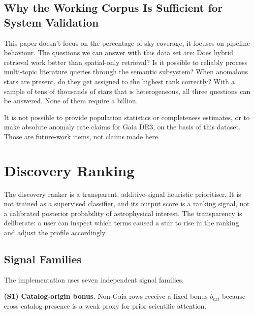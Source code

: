 \documentclass[preprint,12pt,authoryear]{elsarticle}
\begin{document}
\subsection{Why the Working Corpus Is Sufficient for System Validation}
\label{sec:sufficient}

This paper doesn't focus on the percentage of sky coverage, it focuses on pipeline behaviour. The questions we can answer with this data set are: Does hybrid retrieval work better than spatial-only retrieval? Is it possible to reliably process multi-topic literature queries through the semantic subsystem? When anomalous stars are present, do they get assigned to the highest rank correctly? With a sample of tens of thousands of stars that is heterogeneous, all three questions can be answered. None of them require a billion.

It is not possible to provide population statistics or completeness estimates, or to make absolute anomaly rate claims for Gaia DR3, on the basis of this dataset. Those are future-work items, not claims made here.

\section{Discovery Ranking}
\label{sec:ranking}

The discovery ranker is a transparent, additive-signal heuristic prioritiser. It is not trained as a supervised classifier, and its output score is a ranking signal, not a calibrated posterior probability of astrophysical interest. The transparency is deliberate: a user can inspect which terms caused a star to rise in the ranking and adjust the profile accordingly.

\subsection{Signal Families}
\label{sec:signals}

The implementation uses seven independent signal families.

\medskip\noindent\textbf{(S1) Catalog-origin bonus.} Non-Gaia rows receive a fixed bonus $b_{\mathrm{cat}}$ because cross-catalog presence is a weak proxy for prior scientific attention.
\end{document}
